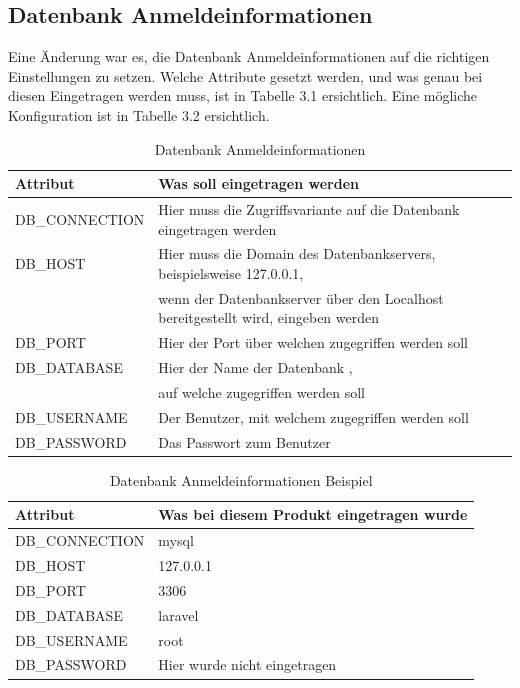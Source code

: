 \subsection{Datenbank Anmeldeinformationen}
Eine Änderung war es, die Datenbank Anmeldeinformationen auf die richtigen Einstellungen zu setzen. Welche Attribute gesetzt werden, und was genau bei diesen Eingetragen werden muss, ist in Tabelle 3.1 ersichtlich. Eine mögliche Konfiguration ist in Tabelle 3.2 ersichtlich.
\begin{table}[h]
	\begin{tabular}{|l|l|}
		\hline
		Attribut         & Was soll eingetragen werden                        \\ \hline
		DB\_CONNECTION     & Hier muss die Zugriffsvariante auf die Datenbank  eingetragen werden                \\ \hline
		DB\_HOST          &  Hier muss die Domain des Datenbankservers, beispielsweise 127.0.0.1,\\& wenn der Datenbankserver über den Localhost bereitgestellt wird, eingeben werden    \\ \hline
		DB\_PORT       & Hier der Port über welchen zugegriffen werden soll \\ \hline
		DB\_DATABASE      & Hier der Name der Datenbank ,\\& auf welche zugegriffen werden soll\\
		DB\_USERNAME   & Der Benutzer, mit welchem zugegriffen werden soll              \\ \hline
		DB\_PASSWORD    & Das Passwort zum Benutzer\\ \hline
	\end{tabular}
\caption{Datenbank Anmeldeinformationen}
\label{sec: Datenbank Anmeldeinformationen}
\end{table}
\begin{table}[h]
	\begin{tabular}{|l|l|}
		\hline
		Attribut         & Was bei diesem Produkt eingetragen wurde                       \\ \hline
		DB\_CONNECTION     & mysql                 \\ \hline
		DB\_HOST          &  127.0.0.1\\ \hline
		DB\_PORT       & 3306\\ \hline
		DB\_DATABASE      & laravel\\
		DB\_USERNAME   & root             \\ \hline
		DB\_PASSWORD    & Hier wurde nicht eingetragen\\ \hline
	\end{tabular}
	\caption{Datenbank Anmeldeinformationen Beispiel}
	\label{sec: Datenbank Anmeldeinformationen Beispiel}
\end{table}
\newpage
